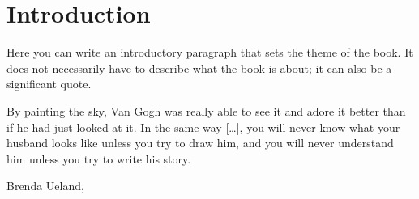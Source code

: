 
\thispagestyle{empty}


\chapter{Introduction}\label{epigraph:cha}

Here you can write an introductory paragraph that sets the theme of the book. It does not necessarily have to describe what the book is about; it can also be a significant quote.

\begin{myquotation} By painting the sky, Van Gogh was really able to see it and adore it better than if he had just looked at it. In the same way [\dots], you will never know what your husband looks like unless you try to draw him, and you will never understand him unless you try to write his story.\par\mbox{}\hfill \emdash{}Brenda Ueland,  \ifxetex\label{gogh-sky-quote}\else\citep[pp.~23--24]{ifyouwanttowrite}\fi\par\end{myquotation}

\hfil{}\hfil